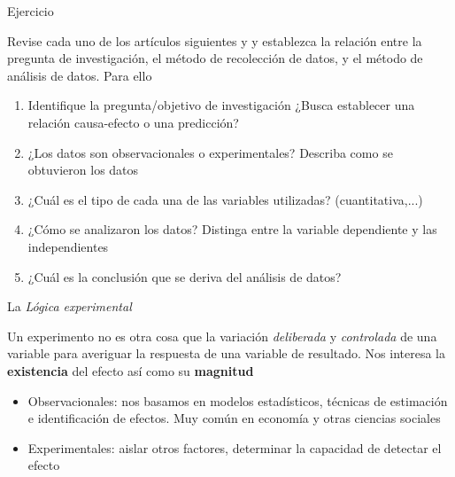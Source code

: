 \documentclass{beamer}
\begin{document}
\begin{frame}{Ejercicio}

Revise cada uno de los artículos siguientes \cite{low_mouse} y \cite{loyn1987effects} y establezca la relación entre la pregunta de investigación, el método de recolección de datos, y el método de análisis de datos. Para ello

\begin{enumerate}
    \item Identifique la pregunta/objetivo de investigación ¿Busca establecer una relación causa-efecto o una predicción?
    \item ¿Los datos son observacionales o experimentales? Describa como se obtuvieron los datos
    \item ¿Cuál es el tipo de cada una de las variables utilizadas? (cuantitativa,...)
    \item ¿Cómo se analizaron los datos? Distinga entre la variable dependiente y las independientes 
    \item ¿Cuál es la conclusión que se deriva del análisis de datos?
\end{enumerate}
    
\end{frame}

\begin{frame}{La \textit{Lógica experimental}}

Un experimento no es otra cosa que la variación \textit{deliberada} y \textit{controlada} de una variable para averiguar la respuesta de una variable de resultado. Nos interesa la \textbf{existencia} del efecto así como su \textbf{magnitud}

\begin{itemize}
    \item Observacionales: nos basamos en modelos estadísticos, técnicas de estimación e identificación de efectos. Muy común en economía y otras ciencias sociales
    \item Experimentales: aislar otros factores, determinar la capacidad de detectar el efecto
\end{itemize}
    
\end{frame}
\end{document}
